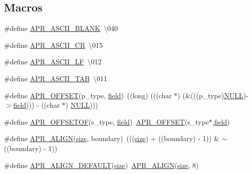 \subsection*{Macros}
\begin{DoxyCompactItemize}
\item 
\#define \hyperlink{group__apr__general_ga60fc208d93123acc7cf915a66e49e654}{A\+P\+R\+\_\+\+A\+S\+C\+I\+I\+\_\+\+B\+L\+A\+NK}~\textquotesingle{}\textbackslash{}040\textquotesingle{}
\item 
\#define \hyperlink{group__apr__general_ga91c14ef7f03e82c07f4d3d56f63f8b6a}{A\+P\+R\+\_\+\+A\+S\+C\+I\+I\+\_\+\+CR}~\textquotesingle{}\textbackslash{}015\textquotesingle{}
\item 
\#define \hyperlink{group__apr__general_ga9e76601cef56a7a5b25f73fe6d57d7d9}{A\+P\+R\+\_\+\+A\+S\+C\+I\+I\+\_\+\+LF}~\textquotesingle{}\textbackslash{}012\textquotesingle{}
\item 
\#define \hyperlink{group__apr__general_gac7162c0b5d026a0717aaa98bf581349d}{A\+P\+R\+\_\+\+A\+S\+C\+I\+I\+\_\+\+T\+AB}~\textquotesingle{}\textbackslash{}011\textquotesingle{}
\item 
\#define \hyperlink{group__apr__general_ga41e537d6ad732766d12cd4eb61531678}{A\+P\+R\+\_\+\+O\+F\+F\+S\+ET}(p\+\_\+type,  \hyperlink{group__APACHE__CORE__DAEMON_gae5c4b068a26ad890b3f11ac8dc993347}{field})~((long) (((char $\ast$) (\&(((p\+\_\+type)\hyperlink{pcre_8txt_ad7f989d16aa8ca809a36bc392c07fba1}{N\+U\+LL})-\/$>$\hyperlink{group__APACHE__CORE__DAEMON_gae5c4b068a26ad890b3f11ac8dc993347}{field}))) -\/ ((char $\ast$) \hyperlink{pcre_8txt_ad7f989d16aa8ca809a36bc392c07fba1}{N\+U\+LL})))
\item 
\#define \hyperlink{group__apr__general_gac16b1187b6ea63706c5dd48c88323dec}{A\+P\+R\+\_\+\+O\+F\+F\+S\+E\+T\+OF}(s\+\_\+type,  \hyperlink{group__APACHE__CORE__DAEMON_gae5c4b068a26ad890b3f11ac8dc993347}{field})~\hyperlink{group__apr__general_ga41e537d6ad732766d12cd4eb61531678}{A\+P\+R\+\_\+\+O\+F\+F\+S\+ET}(s\+\_\+type$\ast$,\hyperlink{group__APACHE__CORE__DAEMON_gae5c4b068a26ad890b3f11ac8dc993347}{field})
\item 
\#define \hyperlink{group__apr__general_ga3c4f50d14ebe7a6add282d879521d552}{A\+P\+R\+\_\+\+A\+L\+I\+GN}(\hyperlink{README_8txt_a870076999eb1486aa63d2e2cf5cdfa55}{size},  boundary)~(((\hyperlink{README_8txt_a870076999eb1486aa63d2e2cf5cdfa55}{size}) + ((boundary) -\/ 1)) \& $\sim$((boundary) -\/ 1))
\item 
\#define \hyperlink{group__apr__general_gab484e98426221f3212fcb67af0467381}{A\+P\+R\+\_\+\+A\+L\+I\+G\+N\+\_\+\+D\+E\+F\+A\+U\+LT}(\hyperlink{README_8txt_a870076999eb1486aa63d2e2cf5cdfa55}{size})~\hyperlink{group__apr__general_ga3c4f50d14ebe7a6add282d879521d552}{A\+P\+R\+\_\+\+A\+L\+I\+GN}(\hyperlink{README_8txt_a870076999eb1486aa63d2e2cf5cdfa55}{size}, 8)
\end{DoxyCompactItemize}
